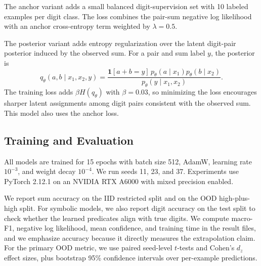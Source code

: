  The anchor variant adds a small balanced digit-supervision set with 10 labeled examples per digit class. The loss combines the pair-sum negative log likelihood with an anchor cross-entropy term weighted by $\lambda=0.5$.

 The posterior variant adds entropy regularization over the latent digit-pair posterior induced by the observed sum. For a pair and sum label $y$, the posterior is
\begin{equation}
    q_\theta(a,b\mid x_1,x_2,y)
    =
    \frac{\mathbf{1}[a+b=y]\,p_\theta(a\mid x_1)p_\theta(b\mid x_2)}
    {p_\theta(y\mid x_1,x_2)}.
    \label{eq:posterior}
\end{equation}
The training loss adds $\beta H(q_\theta)$ with $\beta=0.03$, so minimizing the loss encourages sharper latent assignments among digit pairs consistent with the observed sum. This model also uses the anchor loss.

\subsection{Training and Evaluation}

All models are trained for 15 epochs with batch size 512, AdamW, learning rate $10^{-3}$, and weight decay $10^{-4}$. We run seeds 11, 23, and 37. Experiments use PyTorch 2.12.1 on an NVIDIA RTX A6000 with mixed precision enabled.

We report sum accuracy on the IID restricted split and on the OOD high-plus-high split. For symbolic models, we also report digit accuracy on the \mnist test split to check whether the learned predicates align with true digits. We compute macro-F1, negative log likelihood, mean confidence, and training time in the result files, and we emphasize accuracy because it directly measures the extrapolation claim. For the primary OOD metric, we use paired seed-level $t$-tests and Cohen's $d_z$ effect sizes, plus bootstrap 95\% confidence intervals over per-example predictions.
